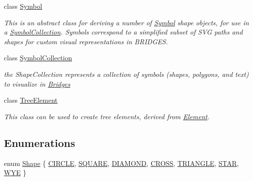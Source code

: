 \begin{DoxyCompactItemize}
class \hyperlink{classbridges_1_1datastructure_1_1_symbol}{Symbol}
\begin{DoxyCompactList}\small\item\em This is an abstract class for deriving a number of \hyperlink{classbridges_1_1datastructure_1_1_symbol}{Symbol} shape objects, for use in a \hyperlink{classbridges_1_1datastructure_1_1_symbol_collection}{Symbol\+Collection}. Symbols correspond to a simplified subset of S\+VG paths and shapes for custom visual representations in B\+R\+I\+D\+G\+ES. \end{DoxyCompactList}\item 
class \hyperlink{classbridges_1_1datastructure_1_1_symbol_collection}{Symbol\+Collection}
\begin{DoxyCompactList}\small\item\em the Shape\+Collection represents a collection of symbols (shapes, polygons, and text) to visualize in \hyperlink{classbridges_1_1_bridges}{Bridges} \end{DoxyCompactList}\item 
class \hyperlink{classbridges_1_1datastructure_1_1_tree_element}{Tree\+Element}
\begin{DoxyCompactList}\small\item\em This class can be used to create tree elements, derived from \hyperlink{classbridges_1_1datastructure_1_1_element}{Element}. \end{DoxyCompactList}\end{DoxyCompactItemize}
\subsection*{Enumerations}
\begin{DoxyCompactItemize}
\item 
enum \hyperlink{namespacebridges_1_1datastructure_a3408f5f44d9c6062e5f3adb7e1bbb7f0}{Shape} \{ \newline
\hyperlink{namespacebridges_1_1datastructure_a3408f5f44d9c6062e5f3adb7e1bbb7f0a18ad7c088ebdda05673a1a586eede99a}{C\+I\+R\+C\+LE}, 
\hyperlink{namespacebridges_1_1datastructure_a3408f5f44d9c6062e5f3adb7e1bbb7f0a63cd254f1ceccbe871f60e3b7f0666d5}{S\+Q\+U\+A\+RE}, 
\hyperlink{namespacebridges_1_1datastructure_a3408f5f44d9c6062e5f3adb7e1bbb7f0a170d2d8b57d448ed19e563ee3cd28b35}{D\+I\+A\+M\+O\+ND}, 
\hyperlink{namespacebridges_1_1datastructure_a3408f5f44d9c6062e5f3adb7e1bbb7f0ab6afc15f9badffaf05a23b3f1ba1081a}{C\+R\+O\+SS}, 
\newline
\hyperlink{namespacebridges_1_1datastructure_a3408f5f44d9c6062e5f3adb7e1bbb7f0ab1bf469052aa5abf241c54f8331b6fc4}{T\+R\+I\+A\+N\+G\+LE}, 
\hyperlink{namespacebridges_1_1datastructure_a3408f5f44d9c6062e5f3adb7e1bbb7f0a995b35f7cf12b5842d94aba9ce5c8b4d}{S\+T\+AR}, 
\hyperlink{namespacebridges_1_1datastructure_a3408f5f44d9c6062e5f3adb7e1bbb7f0aa0494702a25d198f538266dcb8ba52df}{W\+YE}
 \}
\end{DoxyCompactItemize}
